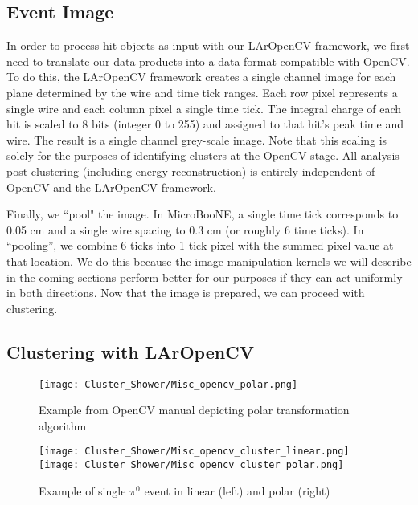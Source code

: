 \documentclass{article}
\begin{document}
\subsection{Event Image}
\par In order to process hit objects as input with our LArOpenCV framework, we first need to translate our data products into a data format compatible with OpenCV. To do this, the LArOpenCV framework creates a single channel image for each plane determined by the wire and time tick ranges. Each row pixel represents a single wire and each column pixel a single time tick. The integral charge of each hit is scaled to 8 bits (integer 0 to 255) and assigned to that hit's peak time and wire. The result is a single channel grey-scale image. Note that this scaling is solely for the purposes of identifying clusters at the OpenCV stage. All analysis post-clustering (including energy reconstruction) is entirely independent of OpenCV and the LArOpenCV framework. 
\par Finally, we ``pool" the image. In MicroBooNE, a single time tick corresponds to 0.05 cm and a single wire spacing to 0.3 cm (or roughly 6 time ticks).  In ``pooling'', we combine 6 ticks into 1 tick pixel with the summed pixel value at that location. We do this because the image manipulation kernels we will describe in the coming sections perform better for our purposes if they can act uniformly in both directions. Now that the image is prepared, we can proceed with clustering.
\subsection{Clustering with LArOpenCV }

\begin{figure}[h!]
\centering
\texttt{[image: Cluster\_Shower/Misc\_opencv\_polar.png]}
\caption{ Example from OpenCV manual depicting polar transformation algorithm \cite{bib:linearPolar}}
\label{fig:polar}
\end{figure}

\begin{figure}[h!]
\centering
\texttt{[image: Cluster\_Shower/Misc\_opencv\_cluster\_linear.png]}
\texttt{[image: Cluster\_Shower/Misc\_opencv\_cluster\_polar.png]}

\caption{ Example of single $\pi^0$ event in linear (left) and polar (right)}
\label{fig:pi0_polar}
\end{figure}
\end{document}
